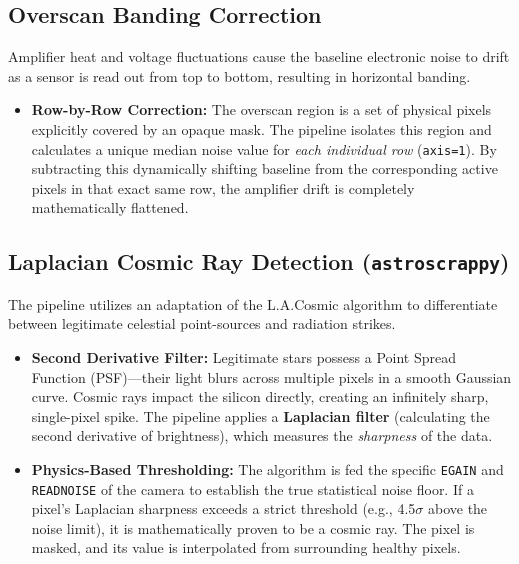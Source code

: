 \documentclass[11pt,a4paper]{article}
\begin{document}
\subsection{Overscan Banding Correction}\label{app:overscan}
Amplifier heat and voltage fluctuations cause the baseline electronic noise to drift as a sensor is read out from top to bottom, resulting in horizontal banding.
\begin{itemize}[leftmargin=*]
    \item \textbf{Row-by-Row Correction:} The overscan region is a set of physical pixels explicitly covered by an opaque mask. The pipeline isolates this region and calculates a unique median noise value for \textit{each individual row} (\texttt{axis=1}). By subtracting this dynamically shifting baseline from the corresponding active pixels in that exact same row, the amplifier drift is completely mathematically flattened. 
\end{itemize}

\subsection{Laplacian Cosmic Ray Detection (\texttt{astroscrappy})}\label{app:cosmic}
The pipeline utilizes an adaptation of the L.A.Cosmic algorithm to differentiate between legitimate celestial point-sources and radiation strikes.
\begin{itemize}[leftmargin=*]
    \item \textbf{Second Derivative Filter:} Legitimate stars possess a Point Spread Function (PSF)—their light blurs across multiple pixels in a smooth Gaussian curve. Cosmic rays impact the silicon directly, creating an infinitely sharp, single-pixel spike. The pipeline applies a \textbf{Laplacian filter} (calculating the second derivative of brightness), which measures the \textit{sharpness} of the data. 
    \item \textbf{Physics-Based Thresholding:} The algorithm is fed the specific \texttt{EGAIN} and \texttt{READNOISE} of the camera to establish the true statistical noise floor. If a pixel's Laplacian sharpness exceeds a strict threshold (e.g., 4.5$\sigma$ above the noise limit), it is mathematically proven to be a cosmic ray. The pixel is masked, and its value is interpolated from surrounding healthy pixels.
\end{itemize}
\end{document}
